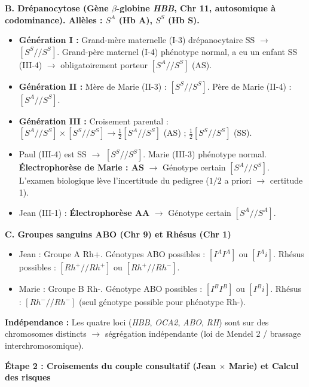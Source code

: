 \documentclass[11pt]{article}
\begin{document}
\begin{exoresolu}
\medskip
\noindent \textbf{B. Drépanocytose (Gène $\beta$-globine \emph{HBB}, Chr 11, autosomique à codominance). Allèles : $S^A$ (Hb A), $S^S$ (Hb S).}
\begin{itemize}
    \item \textbf{Génération I :} Grand-mère maternelle (I-3) drépanocytaire SS $\rightarrow$ $[S^S//S^S]$. Grand-père maternel (I-4) phénotype normal, a eu un enfant SS (III-4) $\rightarrow$ obligatoirement porteur $[S^A//S^S]$ (AS).
    \item \textbf{Génération II :} Mère de Marie (II-3) : $[S^S//S^S]$. Père de Marie (II-4) : $[S^A//S^S]$.
    \item \textbf{Génération III :} Croisement parental : $[S^A//S^S] \times [S^S//S^S] \rightarrow \frac{1}{2} [S^A//S^S]$ (AS) ; $\frac{1}{2} [S^S//S^S]$ (SS).
    \item Paul (III-4) est SS $\rightarrow$ $[S^S//S^S]$. Marie (III-3) phénotype normal. \textbf{Électrophorèse de Marie : AS} $\rightarrow$ Génotype certain $[S^A//S^S]$. L'examen biologique lève l'incertitude du pedigree ($1/2$ a priori $\rightarrow$ certitude 1).
    \item Jean (III-1) : \textbf{Électrophorèse AA} $\rightarrow$ Génotype certain $[S^A//S^A]$.
\end{itemize}

\medskip
\noindent \textbf{C. Groupes sanguins ABO (Chr 9) et Rhésus (Chr 1)}
\begin{itemize}
    \item Jean : Groupe A Rh+. Génotypes ABO possibles : $[I^A I^A]$ ou $[I^A i]$. Rhésus possibles : $[Rh^+//Rh^+]$ ou $[Rh^+//Rh^-]$.
    \item Marie : Groupe B Rh-. Génotype ABO possibles : $[I^B I^B]$ ou $[I^B i]$. Rhésus : $[Rh^-//Rh^-]$ (seul génotype possible pour phénotype Rh-).
\end{itemize}
\textbf{Indépendance :} Les quatre loci (\emph{HBB}, \emph{OCA2}, \emph{ABO}, \emph{RH}) sont sur des chromosomes distincts $\rightarrow$ ségrégation indépendante (loi de Mendel 2 / brassage interchromosomique).

\medskip
\noindent \textbf{Étape 2 : Croisements du couple consultatif (Jean $\times$ Marie) et Calcul des risques}


\end{exoresolu}
\end{document}
